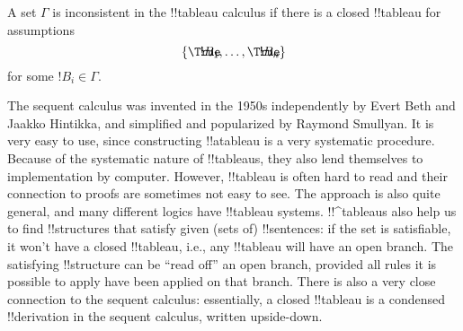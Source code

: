 \documentclass[../../../include/open-logic-section]{subfiles}
\begin{document}
A set $\Gamma$ is inconsistent in the !!{tableau} calculus if there is
a closed !!{tableau} for assumptions
\[
\{\sFmla{\True}{!B_1}, \dots, \sFmla{\True}{!B_n}\} 
\]
for some $!B_i \in \Gamma$.

The sequent calculus was invented in the 1950s independently by Evert
Beth and Jaakko Hintikka, and simplified and popularized by Raymond
Smullyan. It is very easy to use, since constructing !!a{tableau} is a
very systematic procedure. Because of the systematic nature of
!!{tableau}s, they also lend themselves to implementation by
computer. However, !!{tableau} is often hard to read and their
connection to proofs are sometimes not easy to see. The approach is
also quite general, and many different logics have !!{tableau}
systems. !!^{tableau}s also help us to find !!{structure}s that
satisfy given (sets of) !!{sentence}s: if the set is satisfiable, it
won't have a closed !!{tableau}, i.e., any !!{tableau} will have an
open branch. The satisfying !!{structure} can be ``read off'' an open
branch, provided all rules it is possible to apply have been applied
on that branch.  There is also a very close connection to the sequent
calculus: essentially, a closed !!{tableau} is a condensed
!!{derivation} in the sequent calculus, written upside-down.
\end{document}

